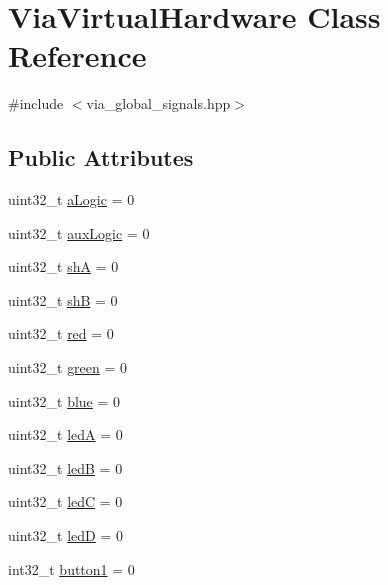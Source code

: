 \hypertarget{class_via_virtual_hardware}{}\section{Via\+Virtual\+Hardware Class Reference}
\label{class_via_virtual_hardware}


{\ttfamily \#include $<$via\+\_\+global\+\_\+signals.\+hpp$>$}

\subsection*{Public Attributes}
\begin{DoxyCompactItemize}
\item 
uint32\+\_\+t \mbox{\hyperlink{class_via_virtual_hardware_a51d26b9473292528dfee51ab9a5709c0}{a\+Logic}} = 0
\item 
uint32\+\_\+t \mbox{\hyperlink{class_via_virtual_hardware_aebf9a3ff013d113a2b0b65281d72d305}{aux\+Logic}} = 0
\item 
uint32\+\_\+t \mbox{\hyperlink{class_via_virtual_hardware_ac981085e2d76de108c7911733fd305ed}{shA}} = 0
\item 
uint32\+\_\+t \mbox{\hyperlink{class_via_virtual_hardware_a19659b129988bf79c42d5e02e29645f4}{shB}} = 0
\item 
uint32\+\_\+t \mbox{\hyperlink{class_via_virtual_hardware_a53b40c806714a0a16f5c4b5335f1a607}{red}} = 0
\item 
uint32\+\_\+t \mbox{\hyperlink{class_via_virtual_hardware_a7c6f187f297c30f720127a2110fa616d}{green}} = 0
\item 
uint32\+\_\+t \mbox{\hyperlink{class_via_virtual_hardware_ada4bc4838ea9308df984a9534f87e575}{blue}} = 0
\item 
uint32\+\_\+t \mbox{\hyperlink{class_via_virtual_hardware_accd5478f7bb7c5790b4c76d8a26784b9}{ledA}} = 0
\item 
uint32\+\_\+t \mbox{\hyperlink{class_via_virtual_hardware_aa428bdfd637c0bad1b54bea37705518c}{ledB}} = 0
\item 
uint32\+\_\+t \mbox{\hyperlink{class_via_virtual_hardware_ade08a2d55624cb07a909565d82f96a82}{ledC}} = 0
\item 
uint32\+\_\+t \mbox{\hyperlink{class_via_virtual_hardware_acc5f1ee39898c72cfb7c8c52a212d08e}{ledD}} = 0
\item 
int32\+\_\+t \mbox{\hyperlink{class_via_virtual_hardware_a5d79c8d592f0d834c0e08e1b98707cfa}{button1}} = 0
\item 

\end{DoxyCompactItemize}
